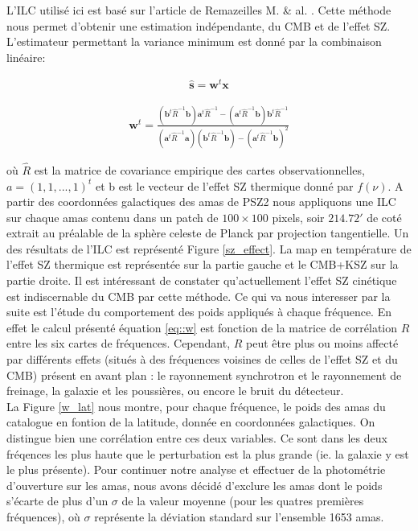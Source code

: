 \documentclass[a4paper,11pt]{article}
\begin{document}
L'ILC utilisé ici est basé sur l'article de Remazeilles M. \&
al. \cite{Remazeilles}. Cette méthode nous permet d'obtenir  une
estimation indépendante, du CMB et de l'effet SZ. L'estimateur
permettant la variance minimum est donné par la combinaison linéaire: 

\begin{align*}
  \widehat{\textbf{s}} = \textbf{w}^t \textbf{x}
\end{align*}

\begin{align}
  \label{eq::w}
  \textbf{w}^t = \frac{\left( \textbf{b}^t\widehat{R}^{-1} \textbf{b}
    \right) \textbf{a}^t \widehat{R}^{-1} - \left( \textbf{a}^t\widehat{R}^{-1} \textbf{b}
    \right) \textbf{b}^t \widehat{R}^{-1}}{\left( \textbf{a}^t\widehat{R}^{-1} \textbf{a}
    \right) \left( \textbf{b}^t\widehat{R}^{-1} \textbf{b}
    \right) - \left( \textbf{a}^t\widehat{R}^{-1} \textbf{b}
    \right)^2}
\end{align}

où $\widehat{R}$ est la matrice de covariance empirique des cartes
observationnelles, $a = (1, 1, ..., 1)^t$ et b est le vecteur de
l'effet SZ thermique donné par $f(\nu)$. A partir des coordonnées
galactiques des amas de PSZ2 nous appliquons une ILC sur chaque amas
contenu dans un patch de $100 \times 100$ pixels, soir $214.72 '$ de
coté extrait au préalable de la sphère celeste de Planck par
projection tangentielle. 
Un des résultats de l'ILC est représenté Figure \ref{sz_effect}. La
map en température de l'effet SZ thermique est représentée sur la
partie gauche et le CMB+KSZ sur la partie droite. Il est intéressant de
constater qu'actuellement l'effet SZ cinétique est indiscernable du
CMB par cette méthode.  
Ce qui va nous interesser par la suite est l'étude du comportement des
poids appliqués à chaque fréquence. En effet le calcul présenté
équation \eqref{eq::w} est fonction de la matrice de corrélation $R$ entre
les six cartes de fréquences. Cependant, $R$ peut être plus ou moins affecté par
différents effets (situés à des fréquences voisines de celles de l'effet SZ et
du CMB) présent en avant plan : le rayonnement synchrotron et le
rayonnement de freinage, la galaxie et les poussières, ou encore le bruit du
détecteur.  \\

La Figure \ref{w_lat} nous montre, pour chaque fréquence, le poids
des amas du catalogue en fontion de la latitude, donnée en coordonnées
galactiques. On distingue bien une corrélation entre ces deux
variables. Ce sont dans les deux fréqences les plus haute que le
perturbation est la plus grande (ie. la galaxie y est le plus
présente). Pour continuer notre analyse et effectuer de la photométrie
d'ouverture sur les amas, nous avons décidé d'exclure les amas dont
le poids s'écarte de plus d'un $\sigma$ de la valeur moyenne (pour les
quatres premières fréquences), où $\sigma$ représente la déviation
standard sur l'ensemble 1653 amas. \\
\end{document}
